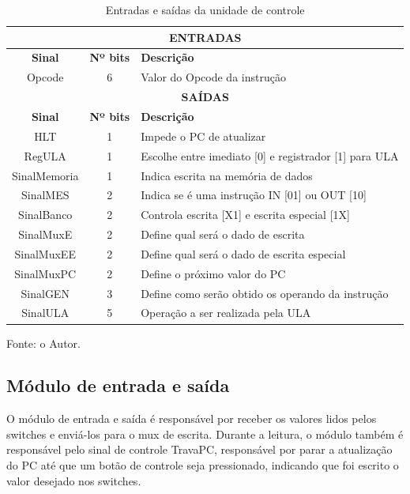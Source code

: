 \documentclass[
	12pt,				%
	oneside,
	a4paper,			%
	english,			%
	french,				%
	spanish,			%
	brazil,				%
	]{abntex2}
\begin{document}
\setlength{\tabcolsep}{10pt} %
\begin{table}[H]
\centering
\caption{Entradas e saídas da unidade de controle}
\label{tab:IO_unidade_controle}
\begin{tabular}{|c|c|l|}
\hline
\multicolumn{3}{|c|}{\textbf{ENTRADAS}} \\
\hline
\textbf{Sinal} & \textbf{Nº bits} & \textbf{Descrição} \\
\hline
Opcode & 6 & Valor do Opcode da instrução \\
\hline
\multicolumn{3}{|c|}{\textbf{SAÍDAS}} \\
\hline
\textbf{Sinal} & \textbf{Nº bits} & \textbf{Descrição} \\
\hline
HLT & 1 & Impede o PC de atualizar \\
\hline
RegULA & 1 & Escolhe entre imediato [0] e registrador [1] para ULA \\
\hline
SinalMemoria & 1 & Indica escrita na memória de dados \\
\hline
SinalMES & 2 & Indica se é uma instrução IN [01] ou OUT [10]\\
\hline
SinalBanco & 2 & Controla escrita [X1] e escrita especial [1X] \\
\hline
SinalMuxE & 2 & Define qual será o dado de escrita \\
\hline
SinalMuxEE & 2 & Define qual será o dado de escrita especial \\
\hline
SinalMuxPC & 2 & Define o próximo valor do PC \\
\hline
SinalGEN & 3 & Define como serão obtido os operando da instrução \\
\hline
SinalULA & 5 & Operação a ser realizada pela ULA \\
\hline
\end{tabular}
\vspace{-0.5em}
\begin{center}
Fonte: o Autor.
\end{center}
\end{table} 



\subsection{Módulo de entrada e saída}

O módulo de entrada e saída é responsável por receber os valores lidos pelos switches e enviá-los para o mux de escrita. Durante a leitura, o módulo também é responsável pelo sinal de controle TravaPC, responsável por parar a atualização do PC até que um botão de controle seja pressionado, indicando que foi escrito o valor desejado nos switches.
\end{document}

